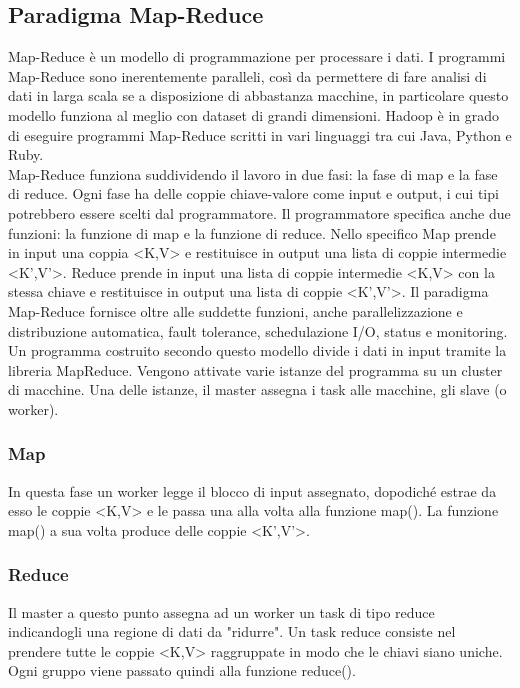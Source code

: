 \subsection{Paradigma Map-Reduce}
Map-Reduce è un modello di programmazione per processare i dati. I programmi Map-Reduce sono inerentemente paralleli, così da permettere di fare analisi di dati in larga scala se a disposizione di abbastanza macchine, in particolare questo modello funziona al meglio con dataset di grandi dimensioni. Hadoop è in grado di eseguire programmi Map-Reduce scritti in vari linguaggi tra cui Java, Python e Ruby. \\
Map-Reduce funziona suddividendo il lavoro in due fasi: la fase di map e la fase di reduce. Ogni fase ha delle coppie chiave-valore come input e output, i cui tipi potrebbero essere scelti dal programmatore. Il programmatore specifica anche due funzioni: la funzione di map e la funzione di reduce. Nello specifico Map prende in input una coppia <K,V> e restituisce in output una lista di coppie intermedie <K',V'>. Reduce prende in input una lista di coppie intermedie <K,V> con la stessa chiave e restituisce in output una lista di coppie <K',V'>. Il paradigma Map-Reduce fornisce oltre alle suddette funzioni, anche parallelizzazione e distribuzione automatica, fault tolerance, schedulazione I/O, status e monitoring. Un programma costruito secondo questo modello divide i dati in input tramite la libreria MapReduce. Vengono attivate varie istanze del programma su un cluster di macchine. Una delle istanze, il master assegna i task alle macchine, gli slave (o worker).
\subsubsection{Map}
In questa fase un worker legge il blocco di input assegnato, dopodiché estrae da esso le coppie <K,V> e le passa una alla volta alla funzione map(). La funzione map() a sua volta produce delle coppie <K',V'>.
\subsubsection{Reduce}
Il master a questo punto assegna ad un worker un task di tipo reduce indicandogli una regione di dati da "ridurre". Un task reduce consiste nel prendere tutte le coppie <K,V> raggruppate in modo che le chiavi siano uniche. Ogni gruppo viene passato quindi alla funzione reduce().
